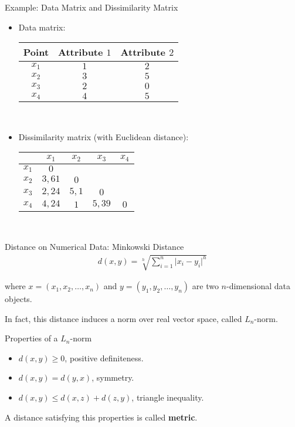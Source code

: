 \begin{frame}{Example: Data Matrix and Dissimilarity Matrix}
	\begin{itemize}
		\item Data matrix: \\[0.1cm]
		      \begin{tabular}{| c | c | c |}
			      \hline
			      Point & Attribute $1$ & Attribute $2$ \\\hline
			      $x_1$ & $1$           & $2$           \\\hline
			      $x_2$ & $3$           & $5$           \\\hline
			      $x_3$ & $2$           & $0$           \\\hline
			      $x_4$ & $4$           & $5$           \\\hline
		      \end{tabular}\\[0.5cm]
		\item Dissimilarity matrix (with Euclidean distance): \\[0.1cm]
		      \begin{tabular}{| c | c | c | c | c |}
			      \hline
			            & $x_1$  & $x_2$ & $x_3$  & $x_4$ \\\hline
			      $x_1$ & $0$    &       &        &       \\\hline
			      $x_2$ & $3,61$ & $0$   &        &       \\\hline
			      $x_3$ & $2,24$ & $5,1$ & $0$    &       \\\hline
			      $x_4$ & $4,24$ & $1$   & $5,39$ & $0$   \\\hline
		      \end{tabular}\\[0.2cm]
	\end{itemize}
\end{frame}

\begin{frame}{Distance on Numerical Data: Minkowski Distance}
	\vspace{-1.5em}
	\begin{align*}
		d(x,y) = \sqrt[h]{\sum_{i=1}^{n} \vert x_i-y_i \vert^h}
	\end{align*}

	where $x = (x_1,x_2, \ldots, x_n)$ and $y = (y_1,y_2,\ldots,y_n)$ are two $n$-dimensional data objects.

	In fact, this distance induces a norm over real vector space, called $L_n$-norm.

	\begin{block}{Properties of a $L_n$-norm}
		\begin{itemize}
			\item $d(x,y) \geq 0$, positive definiteness.
			\item $d(x,y) = d(y,x)$, symmetry.
			\item $d(x,y) \leq d(x,z) + d(z,y)$, triangle inequality.
		\end{itemize}

		A distance satisfying this properties is called \textbf{metric}.
	\end{block}
\end{frame}


